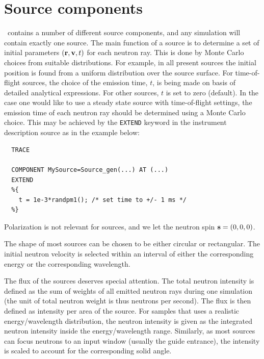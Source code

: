 
\chapter{Source components}
\label{c:source}

\MCS\ contains a number of different source components,
and any simulation will contain exactly one source.
The main function of a source is to determine a set of initial
parameters $({\bf r}, {\bf v}, t)$
for each neutron ray. This is done by Monte Carlo choices from
suitable distributions. For example, in all present sources the initial position is
found from a uniform distribution over the source surface.
For time-of-flight sources, the choice of the emission time, $t$,
is being made on basis of detailed analytical expressions.
For other sources, $t$ is set to zero (default). 
In the case one would like to use a steady state source 
with time-of-flight settings, 
the emission time of each neutron ray should be determined using 
a Monte Carlo choice. This may be achieved by 
the \verb+EXTEND+ keyword in the instrument description source
as in the example below:

\begin{verbatim}
  TRACE

  COMPONENT MySource=Source_gen(...) AT (...)
  EXTEND
  %{
    t = 1e-3*randpm1(); /* set time to +/- 1 ms */
  %}
\end{verbatim}

Polarization is not relevant for sources,
and we let the neutron spin ${\bf s}=(0,0,0)$.

The shape of most sources can be chosen to be either circular or rectangular.
The initial neutron velocity is selected within an interval
of either the corresponding energy or the corresponding wavelength.

The flux of the sources deserves special attention. The total neutron
intensity is defined as the sum of weights of all emitted neutron rays
during one simulation
(the unit of total neutron weight is thus neutrons per second).
The flux is then defined as intensity per area of the source.
For samples that uses a realistic energy/wavelength distribution,
the neutron intensity is given as the integrated neutron intensity
inside the energy/wavelength range. Similarly, as most sources can focus neutrons to an input window (usually the guide entrance), the intensity is scaled to account for the corresponding solid angle.

